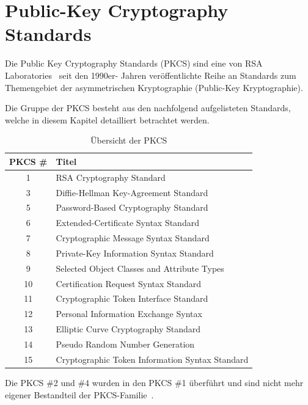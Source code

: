 \documentclass[10pt,a4paper]{article}
\begin{document}
\section{Public-Key Cryptography Standards}
Die Public Key Cryptography Standards (PKCS) sind eine von RSA Laboratories~\cite{rsa-lab}
seit den 1990er- Jahren veröffentlichte Reihe an Standards zum Themengebiet der
asymmetrischen Kryptographie (Public-Key Kryptographie).

Die Gruppe der PKCS besteht aus den nachfolgend aufgelisteten Standards, welche in diesem
Kapitel detailliert betrachtet werden.

\begin{table}[ht]
    \centering
    \begin{tabular}{|c|l|} \hline
        \textbf{PKCS \#} & \textbf{Titel} \\\hline
        1 & RSA Cryptography Standard \\\hline
        3 & Diffie-Hellman Key-Agreement Standard \\\hline
        5 & Password-Based Cryptography Standard \\\hline
        6 & Extended-Certificate Syntax Standard \\\hline
        7 & Cryptographic Message Syntax Standard \\\hline
        8 & Private-Key Information Syntax Standard \\\hline
        9 & Selected Object Classes and Attribute Types \\\hline
        10 & Certification Request Syntax Standard \\\hline
        11 & Cryptographic Token Interface Standard \\\hline
        12 & Personal Information Exchange Syntax \\\hline
        13 & Elliptic Curve Cryptography Standard \\\hline
        14 & Pseudo Random Number Generation \\\hline
        15 & Cryptographic Token Information Syntax Standard \\\hline
    \end{tabular}
    \caption{Übersicht der PKCS}
    \label{tab:pkcs-overview}
\end{table}

\FloatBarrier

Die PKCS \#2 und \#4 wurden in den PKCS \#1 überführt und sind nicht mehr eigener Bestandteil
der PKCS-Familie~\cite[S.1]{kal91}.
\end{document}
